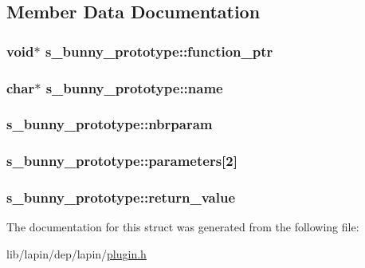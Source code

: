\subsection{Member Data Documentation}
\hypertarget{structs__bunny__prototype_a6bf5828b9e47e1589d61064029a50da3}{
\subsubsection[{function\-\_\-ptr}]{ void$\ast$ s\-\_\-bunny\-\_\-prototype\-::function\-\_\-ptr}}\label{structs__bunny__prototype_a6bf5828b9e47e1589d61064029a50da3}
\hypertarget{structs__bunny__prototype_a3deddb00bd9870447aeadc35202bfccb}{
\subsubsection[{name}]{ char$\ast$ s\-\_\-bunny\-\_\-prototype\-::name}}\label{structs__bunny__prototype_a3deddb00bd9870447aeadc35202bfccb}
\hypertarget{structs__bunny__prototype_a3929d9d5d7cf994f2222e6febf296f07}{
\subsubsection[{nbrparam}]{ s\-\_\-bunny\-\_\-prototype\-::nbrparam}}\label{structs__bunny__prototype_a3929d9d5d7cf994f2222e6febf296f07}
\hypertarget{structs__bunny__prototype_a9b8043caea0ae08be8f91645c9e11ba3}{
\subsubsection[{parameters}]{ s\-\_\-bunny\-\_\-prototype\-::parameters\mbox{[}2\mbox{]}}}\label{structs__bunny__prototype_a9b8043caea0ae08be8f91645c9e11ba3}
\hypertarget{structs__bunny__prototype_af185415cd4f07a5ac4bd4a3f698b1a35}{
\subsubsection[{return\-\_\-value}]{ s\-\_\-bunny\-\_\-prototype\-::return\-\_\-value}}\label{structs__bunny__prototype_af185415cd4f07a5ac4bd4a3f698b1a35}


The documentation for this struct was generated from the following file\-:\begin{DoxyCompactItemize}
\item 
lib/lapin/dep/lapin/\hyperlink{plugin_8h}{plugin.\-h}\end{DoxyCompactItemize}
